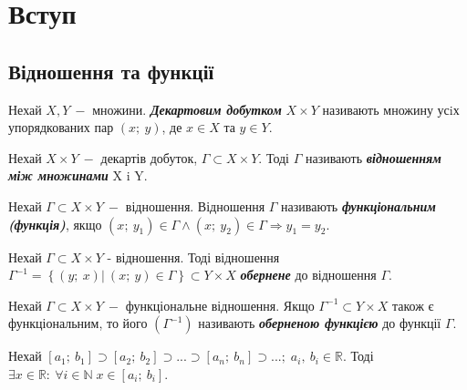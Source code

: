 \newpage
\section{\Large{Вступ}}

\subsection{\large{Відношення та функції}}

\begin{definition} 
    Нехай $X, Y \: -$ множини. \textcolor{NavyBlue}{\textbf{\textit{Декартовим добутком}}} $X \times Y$ називають множину усiх упорядкованих пар $(x; \: y)$, де $x \in X$ та $y \in Y.$
\end{definition}

\begin{definition} 
    Нехай $X \times Y \: -$ декартів добуток, $\Gamma\subset X \times Y$. Тоді $\Gamma$ називають \textcolor{NavyBlue}{\textbf{\textit{відношенням між \newline множинами}}} X i Y. 
\end{definition}

\begin{definition} 
        Нехай $\Gamma\subset X \times Y \: - $ відношення. Відношення $\Gamma$ називають \textcolor{NavyBlue}{\textbf{\textit{функціональним (функція)}}}, якщо $(x; \: y_1) \in \Gamma \wedge  (x; \: y_2) \in \Gamma \Rightarrow y_1 = y_2$.
\end{definition}

\begin{definition} 
        Нехай $\Gamma\subset X \times Y$ - відношення. Тоді відношення $\Gamma^{-1} = \left \{(y; \: x)|\:(x ; \: y) \in \Gamma \right \} \subset Y \times X$ \textcolor{NavyBlue}{\textbf{\textit{обернене}}} до відношення $\Gamma$.
\end{definition}

\begin{definition} 
        Нехай $\Gamma\subset X \times Y \: -$ функціональне відношення. Якщо $\Gamma^{-1}\subset Y \times X$ також є функціональним, то його $(\Gamma^{-1})$ називають \textcolor{NavyBlue}{\textbf{\textit{оберненою функцією}}} до функції $\Gamma$.
\end{definition}

\begin{theorem}
       Нехай $[a_1; \: b_1] \supset  [a_2; \: b_2] \supset...\supset[a_n; \: b_n] \supset ... ; \; a_i, \: b_i \in \mathbb{R}$. Тоді $\exists x \in \mathbb{R}: \ \forall i \in \mathbb{N} \; x \in [a_i; \: b_i]$. 
\end{theorem}

